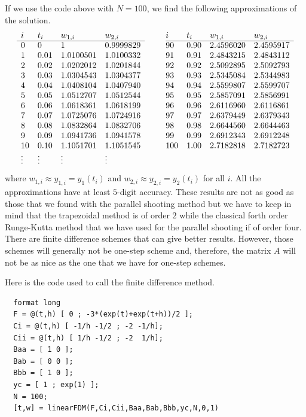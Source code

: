 \begin{egg}
If we use the code above with $N=100$, we find the following approximations of
the solution.
\[
\begin{array}{llllc@{\hspace{2em}}llll}
i & t_i & w_{1,i} & w_{2,i} & & i & t_i & w_{1,i} & w_{2,i} \\
\cline{1-4} \cline{6-9}
0 & 0 & 1 & 0.9999829 && 90 & 0.90 & 2.4596020 & 2.4595917 \\
1 & 0.01 & 1.0100501 & 1.0100332 && 91 & 0.91 & 2.4843215 & 2.4843112 \\
2 & 0.02 & 1.0202012 & 1.0201844 && 92 & 0.92 & 2.5092895 & 2.5092793 \\
3 & 0.03 & 1.0304543 & 1.0304377 && 93 & 0.93 & 2.5345084 & 2.5344983 \\
4 & 0.04 & 1.0408104 & 1.0407940 && 94 & 0.94 & 2.5599807 & 2.5599707 \\
5 & 0.05 & 1.0512707 & 1.0512544 && 95 & 0.95 & 2.5857091 & 2.5856991 \\
6 & 0.06 & 1.0618361 & 1.0618199 && 96 & 0.96 & 2.6116960 & 2.6116861 \\
7 & 0.07 & 1.0725076 & 1.0724916 && 97 & 0.97 & 2.6379449 & 2.6379343 \\
8 & 0.08 & 1.0832864 & 1.0832706 && 98 & 0.98 & 2.6644560 & 2.6644463 \\
9 & 0.09 & 1.0941736 & 1.0941578 && 99 & 0.99 & 2.6912343 & 2.6912248 \\
10 & 0.10 & 1.1051701 & 1.1051545 && 100 & 1.00 & 2.7182818 & 2.7182723 \\
\vdots & \vdots & \vdots & \vdots && & & & \\
\end{array}
\]
where $w_{1,i} \approx y_{1,i} = y_1(t_i)$ and
$w_{2,i} \approx y_{2,i} = y_2(t_i)$ for all $i$.
All the approximations have at least $5$-digit accuracy.  These results
are not as good as those that we found with the parallel
shooting method but we have to keep in mind that the trapezoidal
method is of order $2$ while the classical forth order Runge-Kutta
method that we have used for the parallel shooting if of order four.
There are finite difference schemes that can give better results.
However, those schemes will generally not be one-step scheme and,
therefore, the matrix $A$ will not be as nice as the one that we have
for one-step schemes.

Here is the code used to call the finite difference method.
\begin{code}
\small
\begin{verbatim}
  format long
  F = @(t,h) [ 0 ; -3*(exp(t)+exp(t+h))/2 ];
  Ci = @(t,h) [ -1/h -1/2 ; -2 -1/h];
  Cii = @(t,h) [ 1/h -1/2 ; -2  1/h];
  Baa = [ 1 0 ];
  Bab = [ 0 0 ];
  Bbb = [ 1 0 ];
  yc = [ 1 ; exp(1) ];
  N = 100;
  [t,w] = linearFDM(F,Ci,Cii,Baa,Bab,Bbb,yc,N,0,1)
\end{verbatim}
\end{code}
\end{egg}

